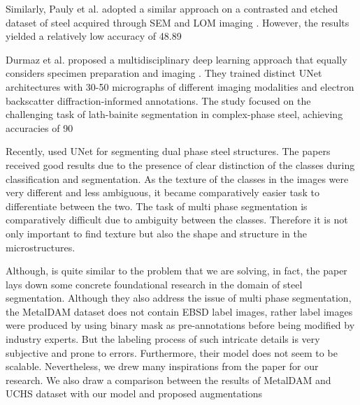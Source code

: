\documentclass[]{article}
\begin{document}
Similarly, Pauly et al. adopted a similar approach on a contrasted and etched dataset of steel acquired through SEM and LOM imaging \cite{LAI2009665}. However, the results yielded a relatively low accuracy of 48.89%

Durmaz et al. proposed a multidisciplinary deep learning approach that equally considers specimen preparation and imaging \cite{Durmaz2021}. They trained distinct UNet architectures with 30-50 micrographs of different imaging modalities and electron backscatter diffraction-informed annotations. The study focused on the challenging task of lath-bainite segmentation in complex-phase steel, achieving accuracies of 90%

Recently, \cite{ebsd1, chaurasia23} used UNet for segmenting dual phase steel structures. The papers received good results due to the presence of clear distinction of the classes during classification and segmentation. As the texture of the classes in the images were very different and less ambiguous, it became comparatively easier task to differentiate between the two. The task of multi phase segmentation is comparatively difficult due to ambiguity between the classes. Therefore it is not only important to find texture but also the shape and structure in the microstructures.

Although, \cite{LUENGO2022232} is quite similar to the problem that we are solving, in fact, the paper lays down some concrete foundational research in the domain of steel segmentation. Although they also address the issue of multi phase segmentation, the MetalDAM dataset does not contain EBSD label images, rather label images were produced by using binary mask as pre-annotations before being modified by industry experts. But the labeling process of such intricate details is very subjective and prone to errors. Furthermore, their model does not seem to be scalable. Nevertheless, we drew many inspirations from the paper for our research. We also draw a comparison between the results of MetalDAM and UCHS dataset with our model and proposed augmentations
\end{document}
